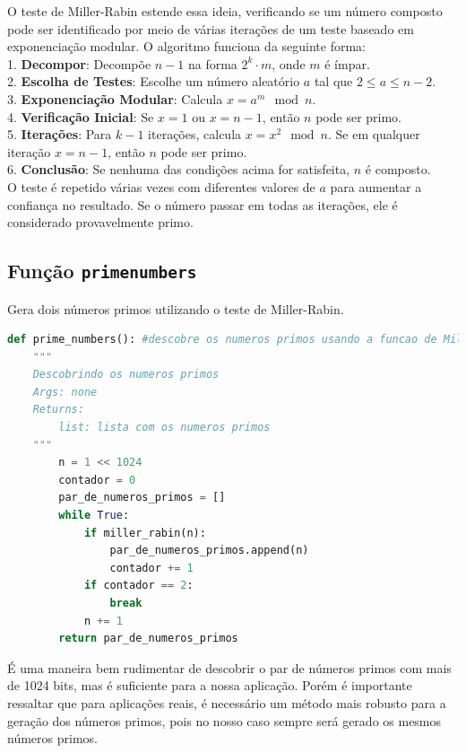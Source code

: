 \documentclass{article}
\begin{document}
O teste de Miller-Rabin estende essa ideia, verificando se um número composto pode ser identificado por
meio de várias iterações de um teste baseado em exponenciação modular. O algoritmo funciona da seguinte forma:\\
1. \textbf{Decompor}: Decompõe \( n-1 \) na forma \( 2^k \cdot m \), onde \( m \) é ímpar.\\
2. \textbf{Escolha de Testes}: Escolhe um número aleatório \( a \) tal que \( 2 \leq a \leq n-2 \).\\
3. \textbf{Exponenciação Modular}: Calcula \( x = a^m \mod n \).\\
4. \textbf{Verificação Inicial}: Se \( x = 1 \) ou \( x = n-1 \), então \( n \) pode ser primo.\\
5. \textbf{Iterações}: Para \( k-1 \) iterações, calcula \( x = x^2 \mod n \). Se em qualquer iteração \( x = n-1 \), então \( n \) pode ser primo.\\
6. \textbf{Conclusão}: Se nenhuma das condições acima for satisfeita, \( n \) é composto.\\

O teste é repetido várias vezes com diferentes valores de \( a \) para aumentar a confiança no resultado. Se o número passar em todas as iterações, ele é considerado provavelmente primo.

\subsection{Função \texttt{prime\textunderscore numbers}}
Gera dois números primos utilizando o teste de Miller-Rabin.

\begin{lstlisting}[language=Python]
    def prime_numbers(): #descobre os numeros primos usando a funcao de Miller-Rabin
    """
    Descobrindo os numeros primos
    Args: none
    Returns:
        list: lista com os numeros primos
    """
        n = 1 << 1024
        contador = 0
        par_de_numeros_primos = []
        while True:
            if miller_rabin(n):
                par_de_numeros_primos.append(n)
                contador += 1
            if contador == 2:
                break
            n += 1
        return par_de_numeros_primos
    \end{lstlisting}

É uma maneira bem rudimentar de descobrir o par de números primos com mais de 1024 bits, mas é suficiente para a nossa aplicação.
 Porém é importante ressaltar que para aplicações
 reais, é necessário um método mais robusto para a geração dos números primos, pois no nosso caso sempre será gerado os mesmos números primos.
\end{document}
